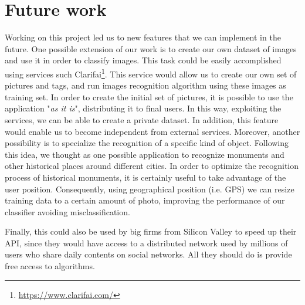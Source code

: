 \section{Future work}
\label{sec:future}

Working on this project led us to new features that we can implement in the future.
One possible extension of our work is to create our own dataset of images and use it in order to classify images. This task could be easily accomplished using services such Clarifai\footnote{\url{https://www.clarifai.com/}}. This service would allow us to create our own set of pictures and tags, and run images recognition algorithm using these images as training set. In order to create the initial set of pictures, it is possible to use the application "\textit{as it is}", distributing it to final users. In this way, exploiting the services, we can be able to create a private dataset. In addition, this feature would enable us to become independent from external services.
Moreover, another possibility is to specialize the recognition of a specific kind of object. Following this idea, we thought as one possible application to recognize monuments and other historical places around different cities. In order to optimize the recognition process of historical monuments, it is certainly useful to take advantage of the user position. Consequently, using geographical position (i.e. GPS) we can resize training data to a certain amount of photo, improving the performance of our classifier avoiding misclassification.

Finally, this could also be used by big firms from Silicon Valley to speed up their API, since they would have access to a distributed network used by millions of users who share daily contents on social networks. All they should do is provide free access to algorithms.